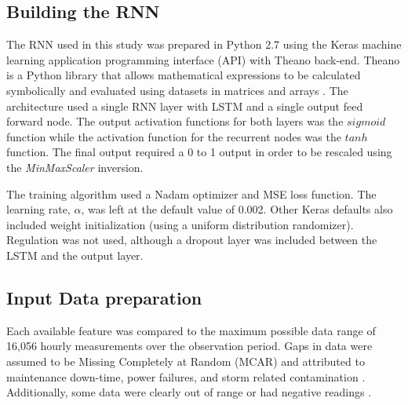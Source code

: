 \documentclass[preprint,12pt,a4paper,authoryear]{elsarticle}
\begin{document}
\begin{linenumbers}
\subsection{Building the RNN}
The RNN used in this study was prepared in Python 2.7 using the Keras machine learning application programming interface (API) \citep{keras2015} with Theano back-end. Theano is a Python library that allows mathematical expressions to be calculated symbolically and evaluated using datasets in matrices and arrays \citep{Al-Rfou2016}. The architecture used a single RNN layer with LSTM and a single output feed forward node. The output activation functions for both layers was the $sigmoid$ function while the activation function for the recurrent nodes was the $tanh$ function. The final output required a 0 to 1 output in order to be rescaled using the \emph{MinMaxScaler} inversion.

The training algorithm used a Nadam optimizer and MSE loss function. The learning rate, $\alpha$, was left at the default value of 0.002. Other Keras defaults also included weight initialization (using a uniform distribution randomizer). Regulation was not used, although a dropout layer was included between the LSTM and the output layer. 

\subsection{Input Data preparation}
Each available feature was compared to the maximum possible data range of 16,056 hourly measurements over the observation period. Gaps in data were assumed to be Missing Completely at Random (MCAR) and attributed to maintenance down-time, power failures, and storm related contamination \citep{Le2007}. Additionally, some data were clearly out of range or had negative readings \citep{Junger2015}.


\end{linenumbers}
\end{document}

